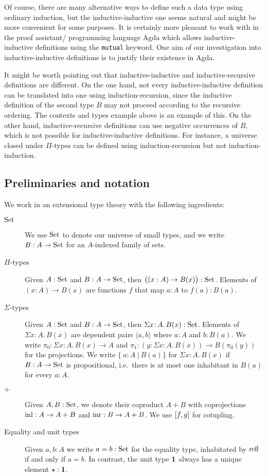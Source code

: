 \documentclass[orivec,envcountsame, ,envcountsect]{llncs}
\begin{document}
Of course, there are many alternative ways to define such a data type
using ordinary induction, but the inductive-inductive one seems
natural and might be more convenient for some purposes. It is
certainly more pleasant to work with in the proof assistant/
programming language Agda \cite{norell2007thesis} which allows
inductive-inductive definitions using the \texttt{mutual} keyword. One
aim of our investigation into inductive-inductive definitions is to
justify their existence in Agda.

It might be worth pointing out that inductive-inductive and
inductive-recursive definitions are different. On the one hand, not
every inductive-inductive definition can be %
translated into one using induction-recursion, since the inductive
definition of the second type $B$ may not proceed according to the
recursive ordering. The contexts and types example above is an example
of this. On the other hand, inductive-recursive definitions can use
negative occurrences of $B$, which is not possible for
inductive-inductive definitions. For instance, a universe closed under
$\Pi$-types can be defined using induction-recursion but not
induction-induction.




\subsection{Preliminaries and notation}

We work in an extensional type theory \cite{NPS1990book} with the
following ingredients:
\begin{description}
\item[$\text{Set}$] We use $\text{Set}$ to denote our universe of small types, and
  we write $B : A \to \text{Set}$ for an $A$-indexed family of sets.
\item[$\Pi$-types] Given $A : \text{Set}$ and $B : A \to \text{Set}$, then $\big((x :
  A) \to B(x)\big) : \text{Set}$.  Elements of $(x : A) \to B(x)$ are
  functions $f$ that map $a : A$ to $f(a) : B(a)$.
\item[$\Sigma$-types] Given $A : \text{Set}$ and $B : A \to \text{Set}$, then
  $\Sigma x\!:\!A.\, B(x) : \text{Set}$. Elements of $\Sigma x\!:\!A.\,
  B(x)$ are dependent pairs $\langle a, b\rangle$ where $a : A$ and $b : B(a)$.
  We write $\pi_0 : \Sigma x\!:\!A.\, B(x) \to A$ and $\pi_1 : (y :
  \Sigma x\!:\!A.\, B(x)) \to B(\pi_0(y))$ for the projections. We write $\{\ a : A\ |\
  B(a)\}$ for $\Sigma x\!:\!A.\, B(x)$ if $B
  : A \to \text{Set}$ is propositional, i.e.\ there is at most one
  inhabitant in $B(a)$ for every $a : A$.
\item[$+$] Given $A, B : \text{Set}$, we denote their coproduct $A + B$ with
  coprojections $\text{inl} : A \to A + B$ and $\text{inr} : B \to A + B$. We
  use $[f, g]$ for cotupling.
\item[Equality and unit types] Given $a, b : A$ we write $a = b :
  \text{Set}$ for the equality type, inhabitated by $\text{refl}$ if and only if
  $a = b$. In contrast, the unit type $\mathbf{1}$
always has a unique element  $\star : \mathbf{1}$.
\end{description}
\end{document}

